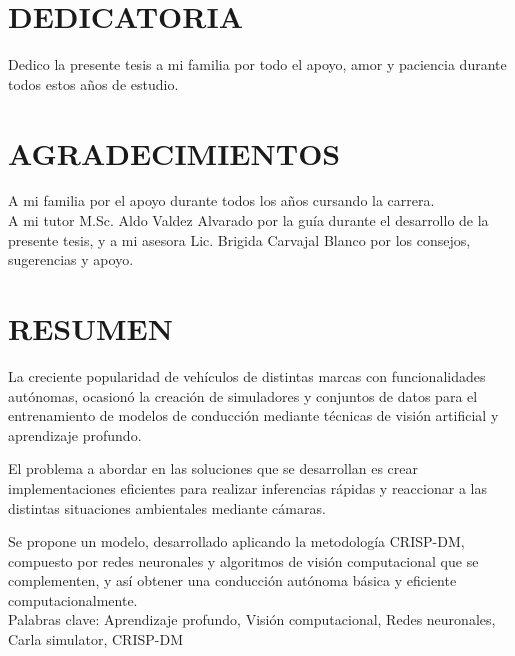 \section*{DEDICATORIA}
\vfill
\hfill\begin{minipage}{\dimexpr\textwidth-9cm}
Dedico la presente tesis a mi familia por todo el apoyo, amor y paciencia durante todos estos años de estudio.
\end{minipage}

\newpage
\section*{\hspace{5.5cm}AGRADECIMIENTOS}

\begin{center}
	A mi familia por el apoyo durante todos los años cursando la carrera.\\
	\vspace{0.2cm}
	A mi tutor M.Sc. Aldo Valdez Alvarado por la guía durante el desarrollo de la presente tesis, y a mi asesora Lic. Brigida Carvajal Blanco por los consejos, sugerencias y apoyo.
\end{center}


\newpage
\section*{\hspace{6.4cm}RESUMEN}
La creciente popularidad de vehículos de distintas marcas con funcionalidades autónomas, ocasionó la creación de simuladores y conjuntos de datos para el entrenamiento de modelos de conducción mediante técnicas de visión artificial y aprendizaje profundo.

El problema a abordar en las soluciones que se desarrollan es crear implementaciones eficientes para realizar inferencias rápidas y reaccionar a las distintas situaciones ambientales mediante cámaras.

Se propone un modelo, desarrollado aplicando la metodología CRISP-DM, compuesto por redes neuronales y algoritmos de visión computacional que se complementen, y así obtener una conducción autónoma básica y eficiente computacionalmente.\\

\noindent Palabras clave: Aprendizaje profundo, Visión computacional, Redes neuronales, Carla simulator, CRISP-DM

